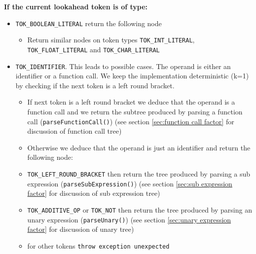 \textbf{If the current lookahead token is of type:}
\begin{itemize}
    \item  \verb!TOK_BOOLEAN_LITERAL! return the following node
   \begin{center}
   \end{center}
   \begin{itemize}
       \item Return similar nodes on token types \verb!TOK_INT_LITERAL!, \verb!TOK_FLOAT_LITERAL! and \verb!TOK_CHAR_LITERAL!
   \end{itemize}
   \item \verb!TOK_IDENTIFIER!. This leads to possible cases. The operand is either an identifier or a function call. We keep the implementation deterministic (k=1) by checking if the next token is a left round bracket.
   \begin{itemize}
       \item If next token is a left round bracket we deduce that the operand is a function call and we return the subtree produced by parsing a function call (\verb!parseFunctionCall()!) (see section \ref{sec:function call factor} for discussion of function call tree)
       \item Otherwise we deduce that the operand is just an identifier and return the following node:
          \begin{center}
   \end{center}
   \item \verb!TOK_LEFT_ROUND_BRACKET! then return the tree produced by parsing a sub expression (\verb!parseSubExpression()!) (see section \ref{sec:sub expression factor} for discussion of sub expression tree)
  \item \verb!TOK_ADDITIVE_OP! or \verb!TOK_NOT! then return the tree produced by parsing an unary expression (\verb!parseUnary()!) (see section \ref{sec:unary expression factor} for discussion of unary tree)
    \item for other tokens \verb!throw exception unexpected!
   \end{itemize}
\end{itemize}



